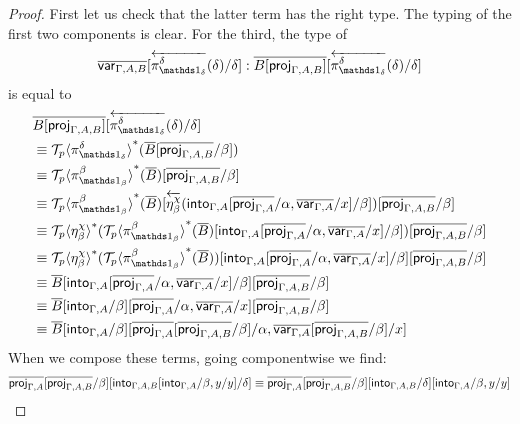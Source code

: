 \documentclass[10pt]{article}
\theoremstyle{definition}
\newcommand{\rewrite}[2]{\overleftarrow{#1}(#2)}
\newcommand\St[2]{\ensuremath{{#1}^*(#2)}}
\newcommand\ApEl[2]{\mathcal{T}_{#1}\langle#2\rangle}
\begin{document}
\begin{proof}
First let us check that the latter term has the right type. The typing of the first two components is clear. For the third, the type of 
\begin{align*}
\upstairs{\qvar{\Gamma, A, B}}[\rewrite{\pi^\delta_{\One_\delta}}{\delta}/\delta] : \upstairs{B[\proj{\Gamma, A, B}]}[\rewrite{\pi^\delta_{\One_\delta}}{\delta}/\delta]
\end{align*}
is equal to
\begin{align*}
&\upstairs{B[\proj{\Gamma, A, B}]}[\rewrite{\pi^\delta_{\One_\delta}}{\delta}/\delta] \\
&\equiv \St{\ApEl{p}{\pi^\delta_{\One_\delta}}}{\upstairs{B}[\upstairs{\proj{\Gamma, A, B}}/\beta]} \\
&\equiv \St{\ApEl{p}{\pi^\beta_{\One_\beta}}}{\upstairs{B}}[\upstairs{\proj{\Gamma, A, B}}/\beta] \\
&\equiv \St{\ApEl{p}{\pi^\beta_{\One_\beta}}}{\upstairs{B}}[\rewrite{\eta^\chi_\beta}{\into{\Gamma, A}[\upstairs{\proj{\Gamma, A}}/\alpha, \upstairs{\qvar{\Gamma, A}}/x]/\beta]}[\upstairs{\proj{\Gamma, A, B}}/\beta] \\
&\equiv \St{\ApEl{p}{\eta^\chi_\beta}}{\St{\ApEl{p}{\pi^\beta_{\One_\beta}}}{\upstairs{B}}[\into{\Gamma, A}[\upstairs{\proj{\Gamma, A}}/\alpha, \upstairs{\qvar{\Gamma, A}}/x]/\beta]}[\upstairs{\proj{\Gamma, A, B}}/\beta] \\
&\equiv \St{\ApEl{p}{\eta^\chi_\beta}}{\St{\ApEl{p}{\pi^\beta_{\One_\beta}}}{\upstairs{B}}}[\into{\Gamma, A}[\upstairs{\proj{\Gamma, A}}/\alpha, \upstairs{\qvar{\Gamma, A}}/x]/\beta][\upstairs{\proj{\Gamma, A, B}}/\beta] \\
&\equiv \upstairs{B}[\into{\Gamma, A}[\upstairs{\proj{\Gamma, A}}/\alpha, \upstairs{\qvar{\Gamma, A}}/x]/\beta][\upstairs{\proj{\Gamma, A, B}}/\beta] \\
&\equiv \upstairs{B}[\into{\Gamma, A}/\beta][\upstairs{\proj{\Gamma, A}}/\alpha, \upstairs{\qvar{\Gamma, A}}/x][\upstairs{\proj{\Gamma, A, B}}/\beta] \\
&\equiv \upstairs{B}[\into{\Gamma, A}/\beta][\upstairs{\proj{\Gamma, A}}[\upstairs{\proj{\Gamma, A, B}}/\beta]/\alpha, \upstairs{\qvar{\Gamma, A}}[\upstairs{\proj{\Gamma, A, B}}/\beta]/x]
\end{align*}
When we compose these terms, going componentwise we find:
\begin{align*}
\upstairs{\proj{\Gamma, A}}[\upstairs{\proj{\Gamma, A, B}}/\beta][\into{\Gamma, A, B}[\into{\Gamma, A}/\beta, y/y]/\delta] 
&\equiv \upstairs{\proj{\Gamma, A}}[\upstairs{\proj{\Gamma, A, B}}/\beta][\into{\Gamma, A, B}/\delta][\into{\Gamma, A}/\beta, y/y] \\

\end{align*}
\end{proof}
\end{document}
